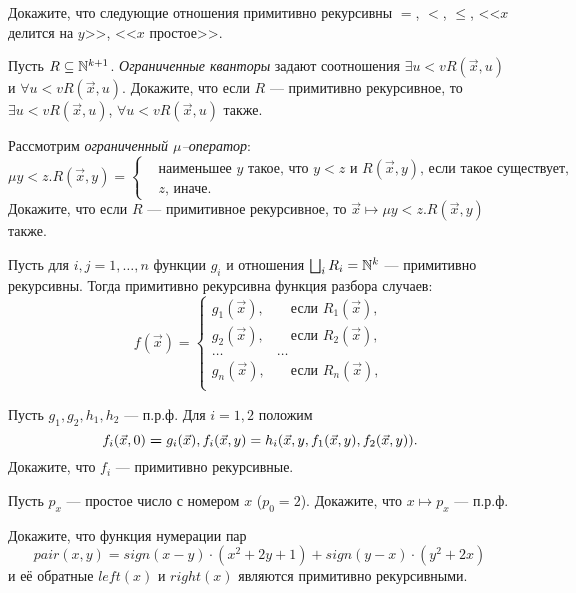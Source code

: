 \documentclass[a4paper, 12pt, num=Г1, date = 19.12.2018]{listok}
\begin{document}
\begin{problem}
	Докажите, что следующие отношения примитивно рекурсивны $=$, $<$, $\le$, <<$x$ делится на $y$>>, <<$x$ простое>>.
\end{problem}
\begin{problem}
	Пусть $R \subseteq \mathbb{N}^{k + 1}$.
	\textit{Ограниченные кванторы} задают соотношения $\exists{u<v} R(\vec x, u)$ и $\forall{u<v} R(\vec x, u)$.
	Докажите, что если $R$ --- примитивно рекурсивное, то $\exists{u < v} R(\vec x, u)$, $\forall{u < v} R(\vec x, u)$ также.
\end{problem}
\begin{problem}
	Рассмотрим \textit{ограниченный $\mu$--оператор}:
	\[
		\mu y < z.R(\vec x, y) = \left \{ \begin{aligned}
				&\text{наименьшее $y$ такое, что $y < z$ и $R(\vec x, y)$, если такое существует,} \\
				&\text{$z$, иначе.}
			\end{aligned} \right .
	\]
	Докажите, что если $R$ --- примитивное рекурсивное, то $\vec x \mapsto \mu y < z.R(\vec x, y)$ также.
\end{problem}
\begin{problem}
	Пусть для $i, j = 1, \dots, n$ функции $g_i$ и отношения $\bigsqcup_i R_i = \mathbb{N}^k$ --- примитивно рекурсивны.
	Тогда примитивно рекурсивна функция разбора случаев:
	\[
		f(\vec x) = \left \{ \begin{aligned}
			g_1(\vec x), &\quad\text{если $R_1(\vec x)$}, \\
			g_2(\vec x), &\quad\text{если $R_2(\vec x)$}, \\
			\dots & \dots \\
			g_n(\vec x), &\quad\text{если $R_n(\vec x)$}, \\
		\end{aligned} \right .
	\]
\end{problem}
\begin{problem}
	Пусть $g_1, g_2, h_1, h_2$ --- п.р.ф.
	Для $i = 1, 2$ положим $$f_i (\vec x, 0) \hm = g_i(\vec x),
	f_i(\vec x, y) = h_i(\vec x, y, f_1(\vec x, y), f_2(\vec x, y)).$$
	Докажите, что $f_i$ --- примитивно рекурсивные.
\end{problem}
\begin{problem}
	Пусть $p_x$ --- простое число с номером $x$ ($p_0 = 2$).
	Докажите, что $x \mapsto p_x$ --- п.р.ф.
\end{problem}
\begin{problem}
	Докажите, что функция нумерации пар $$pair(x, y) = sign(x - y)\cdot (x^2 + 2y + 1)  + sign(y - x) \cdot (y^2 + 2x)$$ и
	её обратные $left(x)$ и $right(x)$ являются примитивно рекурсивными.
\end{problem}
\end{document}
